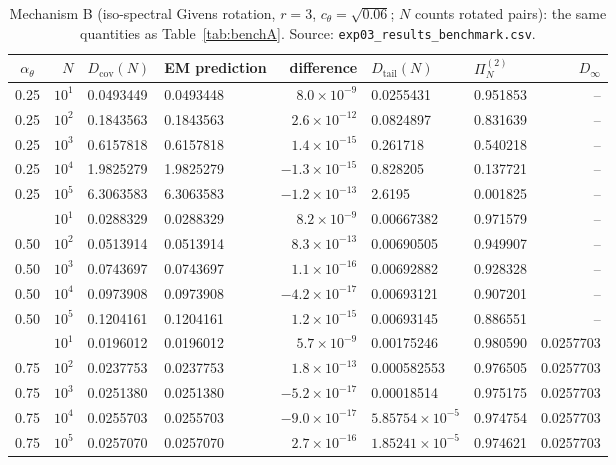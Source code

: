 \documentclass[11pt,reqno]{amsart}
\theoremstyle{plain}
\theoremstyle{definition}
\theoremstyle{remark}
\numberwithin{equation}{section}
\newcommand{\Dcov}{D_{\mathrm{cov}}}
\newcommand{\Dtail}{D_{\mathrm{tail}}}
\begin{document}
\begin{table}[p]
\centering\footnotesize\setlength{\tabcolsep}{4pt}
\caption{Mechanism B (iso-spectral Givens rotation, $r=3$, $c_\theta=\sqrt{0.06}$; $N$ counts rotated pairs): the same quantities as Table~\ref{tab:benchA}. Source: \texttt{exp03\_results\_benchmark.csv}.}
\label{tab:benchB}
\begin{tabular}{@{}crllrllr@{}}
\toprule
$\alpha_\theta$ & $N$ & $\Dcov(N)$ & EM prediction & difference & $\Dtail(N)$ & $\Pi^{(2)}_N$ & $D_\infty$ \\
\midrule
0.25 & $10^{1}$ & 0.0493449 & 0.0493448 & $8.0\times10^{-9}$ & 0.0255431 & 0.951853 & -- \\
0.25 & $10^{2}$ & 0.1843563 & 0.1843563 & $2.6\times10^{-12}$ & 0.0824897 & 0.831639 & -- \\
0.25 & $10^{3}$ & 0.6157818 & 0.6157818 & $1.4\times10^{-15}$ & 0.261718 & 0.540218 & -- \\
0.25 & $10^{4}$ & 1.9825279 & 1.9825279 & $-1.3\times10^{-15}$ & 0.828205 & 0.137721 & -- \\
0.25 & $10^{5}$ & 6.3063583 & 6.3063583 & $-1.2\times10^{-13}$ & 2.6195 & 0.001825 & -- \\
\addlinespace
0.50 & $10^{1}$ & 0.0288329 & 0.0288329 & $8.2\times10^{-9}$ & 0.00667382 & 0.971579 & -- \\
0.50 & $10^{2}$ & 0.0513914 & 0.0513914 & $8.3\times10^{-13}$ & 0.00690505 & 0.949907 & -- \\
0.50 & $10^{3}$ & 0.0743697 & 0.0743697 & $1.1\times10^{-16}$ & 0.00692882 & 0.928328 & -- \\
0.50 & $10^{4}$ & 0.0973908 & 0.0973908 & $-4.2\times10^{-17}$ & 0.00693121 & 0.907201 & -- \\
0.50 & $10^{5}$ & 0.1204161 & 0.1204161 & $1.2\times10^{-15}$ & 0.00693145 & 0.886551 & -- \\
\addlinespace
0.75 & $10^{1}$ & 0.0196012 & 0.0196012 & $5.7\times10^{-9}$ & 0.00175246 & 0.980590 & 0.0257703 \\
0.75 & $10^{2}$ & 0.0237753 & 0.0237753 & $1.8\times10^{-13}$ & 0.000582553 & 0.976505 & 0.0257703 \\
0.75 & $10^{3}$ & 0.0251380 & 0.0251380 & $-5.2\times10^{-17}$ & 0.00018514 & 0.975175 & 0.0257703 \\
0.75 & $10^{4}$ & 0.0255703 & 0.0255703 & $-9.0\times10^{-17}$ & $5.85754\times10^{-5}$ & 0.974754 & 0.0257703 \\
0.75 & $10^{5}$ & 0.0257070 & 0.0257070 & $2.7\times10^{-16}$ & $1.85241\times10^{-5}$ & 0.974621 & 0.0257703 \\

\end{tabular}
\end{table}
\end{document}
